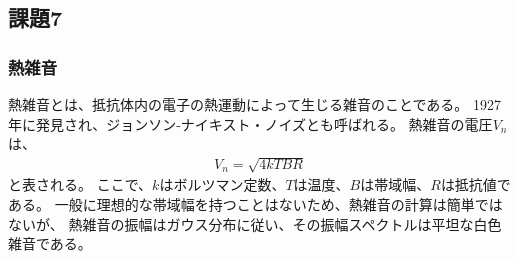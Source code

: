 \subsection{課題7}

\subsubsection{熱雑音}
熱雑音とは、抵抗体内の電子の熱運動によって生じる雑音のことである。
1927年に発見され、ジョンソン-ナイキスト・ノイズとも呼ばれる。
熱雑音の電圧$V_n$は、
\begin{align*}
    V_n = \sqrt{4kTBR}
\end{align*}
と表される。
ここで、$k$はボルツマン定数、$T$は温度、$B$は帯域幅、$R$は抵抗値である。
一般に理想的な帯域幅を持つことはないため、熱雑音の計算は簡単ではないが、
熱雑音の振幅はガウス分布に従い、その振幅スペクトルは平坦な白色雑音である。
